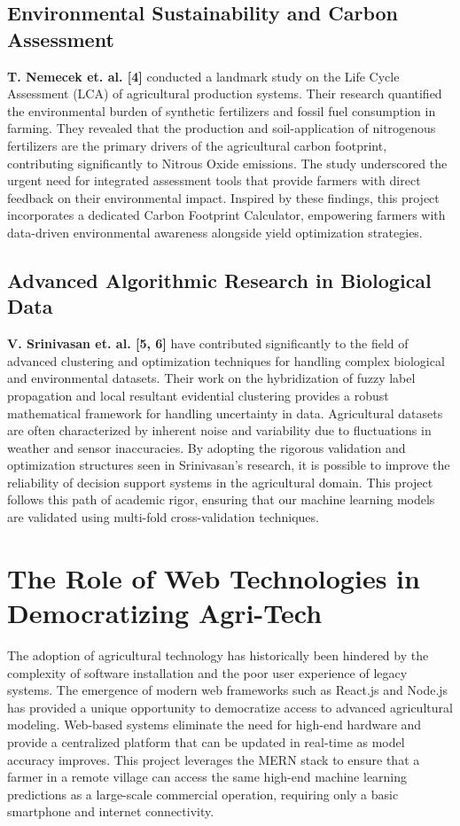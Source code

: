 \documentclass[12pt,a4paper]{report}
\begin{document}
\subsection{Environmental Sustainability and Carbon Assessment}
\textbf{T. Nemecek et. al. [4]} conducted a landmark study on the Life Cycle Assessment (LCA) of agricultural production systems. Their research quantified the environmental burden of synthetic fertilizers and fossil fuel consumption in farming. They revealed that the production and soil-application of nitrogenous fertilizers are the primary drivers of the agricultural carbon footprint, contributing significantly to Nitrous Oxide emissions. The study underscored the urgent need for integrated assessment tools that provide farmers with direct feedback on their environmental impact. Inspired by these findings, this project incorporates a dedicated Carbon Footprint Calculator, empowering farmers with data-driven environmental awareness alongside yield optimization strategies.

\subsection{Advanced Algorithmic Research in Biological Data}
\textbf{V. Srinivasan et. al. [5, 6]} have contributed significantly to the field of advanced clustering and optimization techniques for handling complex biological and environmental datasets. Their work on the hybridization of fuzzy label propagation and local resultant evidential clustering provides a robust mathematical framework for handling uncertainty in data. Agricultural datasets are often characterized by inherent noise and variability due to fluctuations in weather and sensor inaccuracies. By adopting the rigorous validation and optimization structures seen in Srinivasan's research, it is possible to improve the reliability of decision support systems in the agricultural domain. This project follows this path of academic rigor, ensuring that our machine learning models are validated using multi-fold cross-validation techniques.

\section{The Role of Web Technologies in Democratizing Agri-Tech}
The adoption of agricultural technology has historically been hindered by the complexity of software installation and the poor user experience of legacy systems. The emergence of modern web frameworks such as React.js and Node.js has provided a unique opportunity to democratize access to advanced agricultural modeling. Web-based systems eliminate the need for high-end hardware and provide a centralized platform that can be updated in real-time as model accuracy improves. This project leverages the MERN stack to ensure that a farmer in a remote village can access the same high-end machine learning predictions as a large-scale commercial operation, requiring only a basic smartphone and internet connectivity.
\end{document}
